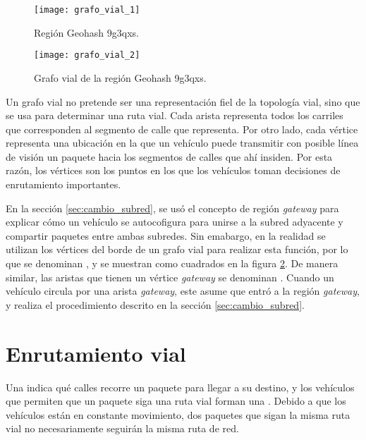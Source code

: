 \begin{figure}[th!]
\centering
\texttt{[image: grafo\_vial\_1]} 
\decoRule
\caption[Región Geohash 9g3qxs]{Región Geohash 9g3qxs.}
\label{fig:grafo_vial_1}
\end{figure}

\begin{figure}[th!]
\centering
\texttt{[image: grafo\_vial\_2]} 
\decoRule
\caption[Grafo vial de la región Geohash 9g3qxs]{Grafo vial de la región
Geohash 9g3qxs.}
\label{fig:grafo_vial_2}
\end{figure}

Un grafo vial no pretende ser una representación fiel de la topología vial,
sino que se usa para determinar una ruta vial. Cada arista representa todos los
carriles que corresponden al segmento de calle que representa. Por otro lado,
cada vértice representa una ubicación en la que un vehículo puede transmitir
con posible línea de visión un paquete hacia los segmentos de calles que ahí
insiden. Por esta razón, los vértices son los puntos en los que los vehículos
toman decisiones de enrutamiento importantes.

En la sección \ref{sec:cambio_subred}, se usó el concepto de región
\textit{gateway} para explicar cómo un vehículo se autocofigura para unirse a
la subred adyacente y compartir paquetes entre ambas subredes. Sin emabargo, en
la realidad se utilizan los vértices del borde de un grafo vial para realizar
esta función, por lo que se denominan , y se
muestran como cuadrados en la figura \ref{fig:grafo_vial_2}. De manera
similar, las aristas que tienen un vértice \textit{gateway} se denominan
. Cuando un vehículo circula por una arista
\textit{gateway}, este asume que entró a la región \textit{gateway}, y realiza
el procedimiento descrito en la sección \ref{sec:cambio_subred}.

\section{Enrutamiento vial}

\label{sec:enrutamiento_vial}

Una  indica qué calles recorre un paquete para llegar a su
destino, y los vehículos que permiten que un paquete siga una ruta vial forman
una . Debido a que los vehículos están en constante
movimiento, dos paquetes que sigan la misma ruta vial no necesariamente
seguirán la misma ruta de red.

